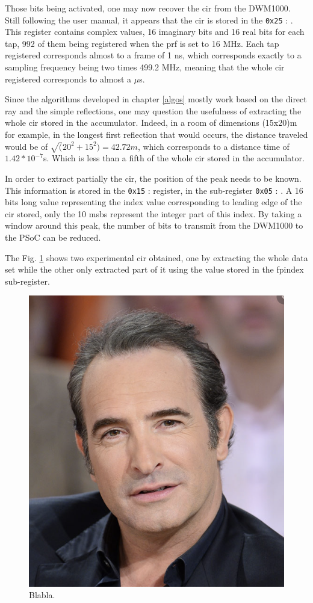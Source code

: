 Those bits being activated, one may now recover the \gls{cir} from the DWM1000. Still following the user manual, it appears that the \gls{cir} is stored in the \texttt{0x25} : . This register contains complex values, 16 imaginary bits and 16 real bits for each tap, 992 of them being registered when the \gls{prf} is set to 16 MHz. Each tap registered corresponds almost to a frame of 1 ns, which corresponds exactly to a sampling frequency  being two times 499.2 MHz, meaning that the whole \gls{cir} registered corresponds to almost a $\mu$s.
\vspace{2mm}

Since the algorithms developed in chapter \ref{algos} mostly work based on the direct ray and the simple reflections, one may question the usefulness of extracting the whole \gls{cir} stored in the accumulator. Indeed, in a room of dimensions (15x20)m for example, in the longest first reflection that would occurs, the distance traveled would be of $\sqrt(20^2 + 15^2) = 42.72m$, which corresponds to a distance time of $1.42*10^{-7}$s. Which is less than a fifth of the whole \gls{cir} stored in the accumulator.
\vspace{2mm}

In order to extract partially the \gls{cir}, the position of the peak needs to be known. This information is stored in the \texttt{0x15} :  register, in the sub-register \texttt{0x05} :  . A 16 bits long value representing the index value corresponding to leading edge of the \gls{cir} stored, only the 10 \glspl{msb} represent the integer part of this index. By taking a window around this peak, the number of bits to transmit from the DWM1000 to the PSoC can be reduced.
\vspace{2mm}

The Fig. \ref{fig:cir_long_short} shows two experimental \gls{cir} obtained, one by extracting the whole data set while the other only extracted part of it using the value stored in the \gls{fpindex} sub-register.

\begin{figure}[H]
\centering
\includegraphics[width=.2\linewidth]{Images/Temporary_pic.png}
\caption{Blabla. \label{fig:cir_long_short}}
\end{figure}


